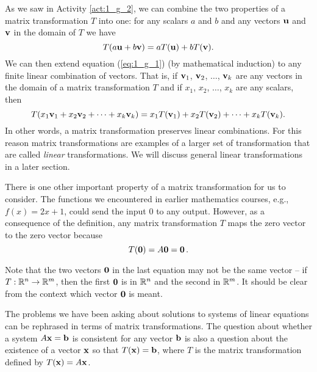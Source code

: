 As we saw in Activity \ref{act:1_g_2}, we can combine the two properties of a matrix transformation $T$ into one: for any scalars $a$ and $b$ and any vectors $\mathbf{u}$ and $\mathbf{v}$ in the domain of $T$ we have  
\begin{equation} \label{eq:1_g_1}
T(a\mathbf{u}+b\mathbf{v}) = aT(\mathbf{u}) + bT(\mathbf{v}).
\end{equation}
 We can then extend equation (\ref{eq:1_g_1}) (by mathematical induction) to any finite linear combination of vectors. That is, if $\mathbf{v}_1$, $\mathbf{v}_2$, $\ldots$, $\mathbf{v}_k$ are any vectors in the domain of a matrix transformation $T$ and if $x_1$, $x_2$, $\ldots$, $x_k$ are any scalars, then
\begin{equation} \label{eq:1_g_2}
T(x_1 \mathbf{v}_1 + x_2 \mathbf{v}_2 + \cdots + x_k \mathbf{v}_k) = x_1 T(\mathbf{v}_1) + x_2 T(\mathbf{v}_2) + \cdots + x_k T(\mathbf{v}_k).
\end{equation}
In other words, a matrix transformation preserves linear combinations. For this reason matrix transformations are examples of a larger set of transformation that are called \emph{linear} transformations. We will discuss general linear transformations in a later section.
 

There is one other important property of a matrix transformation for us to consider. The functions we encountered in earlier mathematics courses, e.g., $f(x) = 2x+1$, could send the input 0 to any output. However, as a consequence of the definition, any matrix transformation $T$ maps the zero vector to the zero vector because
\[ T(\mathbf{0}) = A\mathbf{0} = \mathbf{0} \,.\]

Note that the two vectors $\mathbf{0}$ in the last equation may not be the same vector -- if $T : \mathbb{R}^n \to \mathbb{R}^m$, then the first $\mathbf{0}$ is in $\mathbb{R}^n$ and the second in $\mathbb{R}^m$. It should be clear from the context which vector $\mathbf{0}$ is meant. 


\label{sec:trans_onto_oto}

The problems we have been asking about solutions to systems of linear equations can be rephrased in terms of matrix transformations. The question about whether a system $A \mathbf{x} = \mathbf{b}$ is consistent for any vector $\mathbf{b}$ is also a question about the existence of a vector $\mathbf{x}$ so that $T(\mathbf{x}) = \mathbf{b}$, where $T$ is the matrix transformation defined by $T(\mathbf{x}) = A \mathbf{x}$. 


